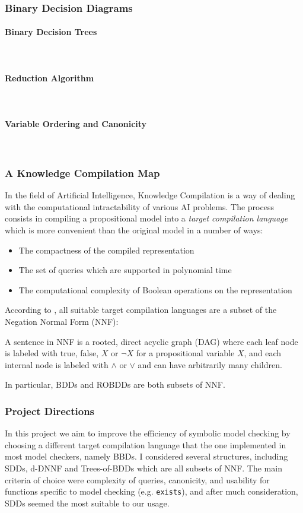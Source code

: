 \documentclass{article}
\newenvironment{definition}[1][Definition]{\begin{trivlist}
\item[\hskip \labelsep {\bfseries #1}]}{\end{trivlist}}
\newcommand{\myparagraph}[1]{\paragraph{#1}\mbox{}\\}
\begin{document}
\subsubsection{Binary Decision Diagrams}

\myparagraph{Binary Decision Trees}

\myparagraph{Reduction Algorithm}

\myparagraph{Variable Ordering and Canonicity}

\subsubsection{A Knowledge Compilation Map}

In the field of Artificial Intelligence, Knowledge Compilation is a way of dealing with the computational intractability of various AI problems. The process consists in compiling a propositional model into a \textit{target compilation language} which is more convenient than the original model in a number of ways: 
\begin{itemize} 
\item The compactness of the compiled representation
\item The set of queries which are supported in polynomial time 
\item The computational complexity of Boolean operations on the representation 
\end{itemize}

According to \cite{knowledge_compilation_map}, all suitable target compilation languages are a subset of the Negation Normal Form (NNF):
\begin{definition}
A sentence in NNF is a rooted, direct acyclic graph (DAG) where each leaf node is labeled with true, false, $X$ or $\lnot X$ for a propositional variable $X$, and each internal node is labeled with $\land$ or $\lor$ and can have arbitrarily many children. 
\end{definition}  

In particular, BDDs and ROBDDs are both subsets of NNF. 


\subsubsection{Project Directions}

 In this project we aim to improve the efficiency of symbolic model checking by choosing a different target compilation language that the one implemented in most model checkers, namely BBDs. 
I considered several structures, including SDDs, d-DNNF and Trees-of-BDDs which are all subsets of NNF. The main criteria of choice were complexity of queries, canonicity, and usability for functions specific to model checking (e.g. \texttt{exists}), and after much consideration, SDDs seemed the most suitable to our usage.
\end{document}
